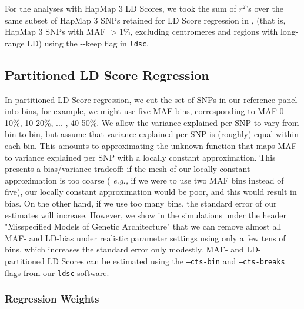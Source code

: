 \documentclass[11pt]{article}
\numberwithin{equation}{section}
\begin{document}
For the analyses with HapMap 3 \cite{international2010integrating} LD Scores,
we took the sum of $r^2$'s over the same subset of HapMap 3 SNPs retained for LD Score regression in
\cite{buliksullivan2014}, (that is, HapMap 3 SNPs with MAF $> 1\%$, excluding centromeres and regions with long-range LD)
using the {-}{-}keep flag in \texttt{ldsc}.


\subsection{Partitioned LD Score Regression}

In partitioned LD Score regression, we cut the set of SNPs in our reference panel into bins, for example,
we might use five MAF bins, corresponding to MAF 0-10\%, 10-20\%, ... , 40-50\%. 
We allow the variance explained per SNP to vary from bin to bin, but assume that variance explained per SNP is (roughly) 
equal within each bin. 
This amounts to approximating the unknown function that maps MAF to variance explained per SNP with a locally 
constant approximation. 
This presents a bias/variance tradeoff: if the mesh of our locally constant approximation is too coarse (
\emph{e.g.,} if we were to use two MAF bins instead of five), 
our locally constant approximation would be poor, and this would result in bias. 
On the other hand, if we use too many bins, the standard error of our estimates will increase. 
However, we show in the simulations under the header "Misspecified Models of Genetic Architecture" that
we can remove almost all MAF- and LD-bias under realistic parameter settings using only a few tens of bins, which 
increases the standard error only modestly.
MAF- and LD- partitioned LD Scores can be estimated using the \texttt{--cts-bin} and  \texttt{--cts-breaks} flags
from our \texttt{ldsc} software.


\subsubsection{Regression Weights} 
\end{document}
